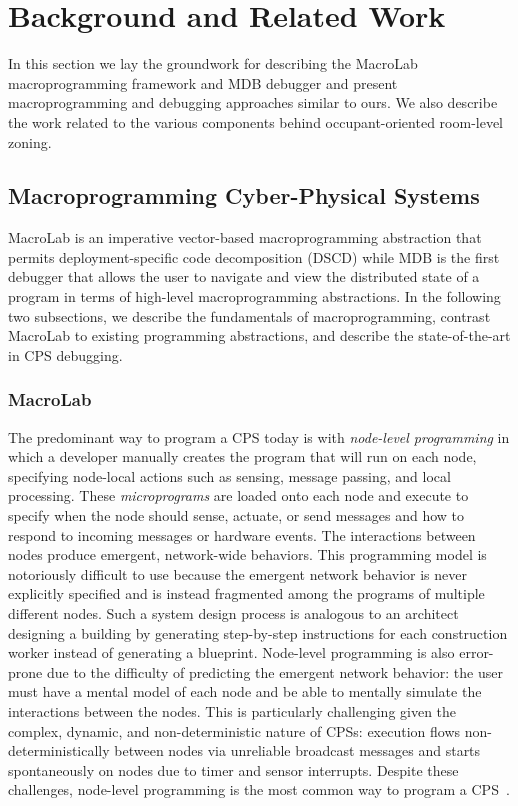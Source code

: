 \chapter{Background and Related Work}

In this section we lay the groundwork for describing the MacroLab
macroprogramming framework and MDB debugger and present macroprogramming and
debugging approaches similar to ours. We also describe the work related to the
various components behind occupant-oriented room-level zoning.

\section{Macroprogramming Cyber-Physical Systems}
MacroLab is an imperative vector-based macroprogramming abstraction that permits
deployment-specific code decomposition (DSCD) while MDB is the first debugger
that allows the user to navigate and view the distributed state of a program in
terms of high-level macroprogramming abstractions. In the following two subsections, we describe
the fundamentals of macroprogramming, contrast MacroLab to existing
programming abstractions, and describe the state-of-the-art in CPS debugging.


\subsection{MacroLab}
The predominant way to program a CPS today is with {\em node-level programming}
in which a developer manually creates the program that will run on each node,
specifying node-local actions such as sensing, message passing, and local
processing.  These {\em microprograms} are loaded onto each node and execute to
specify when the node should sense, actuate, or send messages and how to respond
to incoming messages or hardware events. The interactions between nodes produce
emergent, network-wide behaviors.  This programming model is notoriously
difficult to use because the emergent network behavior is never explicitly
specified and is instead fragmented among the programs of multiple different
nodes. Such a system design process is analogous to an architect designing a
building by generating step-by-step instructions for each construction worker
instead of generating a blueprint. Node-level programming is also error-prone
due to the difficulty of predicting the emergent network behavior: the user must
have a mental model of each node and be able to mentally simulate the
interactions between the nodes.  This is particularly challenging given the
complex, dynamic, and non-deterministic nature of CPSs: execution flows
non-deterministically between nodes via unreliable broadcast messages and starts
spontaneously on nodes due to timer and sensor interrupts.  Despite these
challenges, node-level programming is the most common way to program a
CPS~\cite{Gay,bhatti2005mem,dunkels2004cla}.

